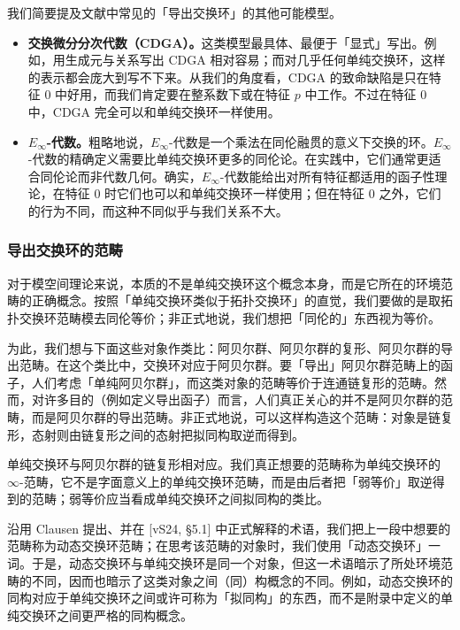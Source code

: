 我们简要提及文献中常见的「导出交换环」的其他可能模型。

\begin{itemize}[leftmargin=1.6em]
\item \textbf{交换微分分次代数（CDGA）。}这类模型最具体、最便于「显式」写出。例如，用生成元与关系写出 CDGA 相对容易；而对几乎任何单纯交换环，这样的表示都会庞大到写不下来。从我们的角度看，CDGA 的致命缺陷是只在特征 0 中好用，而我们肯定要在整系数下或在特征 $p$ 中工作。不过在特征 0 中，CDGA 完全可以和单纯交换环一样使用。
\item \textbf{$E_\infty$-代数。}粗略地说，$E_\infty$-代数是一个乘法在同伦融贯的意义下交换的环。$E_\infty$-代数的精确定义需要比单纯交换环更多的同伦论。在实践中，它们通常更适合同伦论而非代数几何。确实，$E_\infty$-代数能给出对所有特征都适用的函子性理论，在特征 0 时它们也可以和单纯交换环一样使用；但在特征 0 之外，它们的行为不同，而这种不同似乎与我们关系不大。
\end{itemize}

\subsubsection{导出交换环的范畴}

对于模空间理论来说，本质的不是单纯交换环这个概念本身，而是它所在的环境范畴的正确概念。按照「单纯交换环类似于拓扑交换环」的直觉，我们要做的是取拓扑交换环范畴模去同伦等价；非正式地说，我们想把「同伦的」东西视为等价。

为此，我们想与下面这些对象作类比：阿贝尔群、阿贝尔群的复形、阿贝尔群的导出范畴。在这个类比中，交换环对应于阿贝尔群。要「导出」阿贝尔群范畴上的函子，人们考虑「单纯阿贝尔群」，而这类对象的范畴等价于连通链复形的范畴。然而，对许多目的（例如定义导出函子）而言，人们真正关心的并不是阿贝尔群的范畴，而是阿贝尔群的导出范畴。非正式地说，可以这样构造这个范畴：对象是链复形，态射则由链复形之间的态射把拟同构取逆而得到。

单纯交换环与阿贝尔群的链复形相对应。我们真正想要的范畴称为单纯交换环的 $\infty$-范畴，它不是字面意义上的单纯交换环范畴，而是由后者把「弱等价」取逆得到的范畴；弱等价应当看成单纯交换环之间拟同构的类比。

沿用 Clausen 提出、并在 [vS24, §5.1] 中正式解释的术语，我们把上一段中想要的范畴称为动态交换环范畴；在思考该范畴的对象时，我们使用「动态交换环」一词。于是，动态交换环与单纯交换环是同一个对象，但这一术语暗示了所处环境范畴的不同，因而也暗示了这类对象之间（同）构概念的不同。例如，动态交换环的同构对应于单纯交换环之间或许可称为「拟同构」的东西，而不是附录中定义的单纯交换环之间更严格的同构概念。

